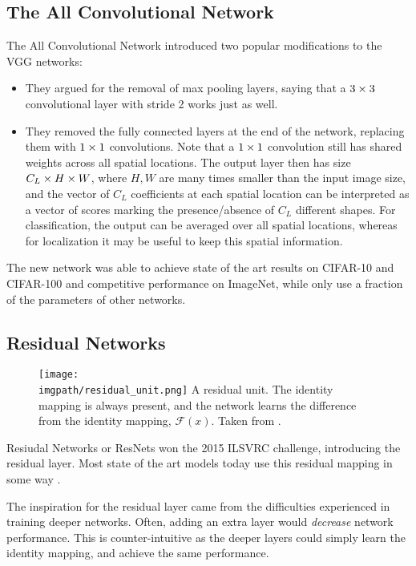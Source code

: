 \subsection{The All Convolutional Network}
The All Convolutional Network \cite{springenberg_striving_2014-3} introduced two
popular modifications to the VGG networks:
%
\begin{itemize}
  \item They argued for the removal of max pooling layers, saying that a $3\times 3$
    convolutional layer with stride 2 works just as well.
  \item They removed the fully connected layers at the end of the network,
    replacing them with $1\times 1$ convolutions. Note that a $1\times 1$ convolution
    still has shared weights across all spatial locations. The output layer then
    has size $C_L \times H \times W$, where $H, W$ are many times smaller than the input
    image size, and the vector of $C_L$ coefficients at each spatial location
    can be interpreted as a vector of scores marking the presence/absence of
    $C_L$ different shapes. For classification, the output can be averaged over
    all spatial locations, whereas for localization it may be useful to keep
    this spatial information.
\end{itemize}
The new network was able to achieve state of the art results on CIFAR-10 and
CIFAR-100 and competitive performance on ImageNet, while only use a fraction of
the parameters of other networks.

\subsection{Residual Networks}\label{sec:ch2:resnets}
  \begin{figure}[tb]
    \centering
    \texttt{[image: \\imgpath/residual\_unit.png]}
          {A residual unit. The identity mapping is always present, and the
            network learns the difference from the identity mapping, $\mathcal{F}(x)$.
            Taken from \cite{he_deep_2016}.}
      \label{fig:ch2:residual_unit}
  \end{figure}
  Resiudal Networks or ResNets won the 2015 ILSVRC challenge, introducing the
  residual layer. Most state of the art models today use this residual mapping
  in some way \cite{zagoruyko_wide_2016-1, xie_aggregated_2017}.

  The inspiration for the residual layer came from the difficulties
  experienced in training deeper networks. Often, adding an extra layer would
  \emph{decrease} network performance. This is counter-intuitive as the deeper
  layers could simply learn the identity mapping, and achieve the same
  performance.

